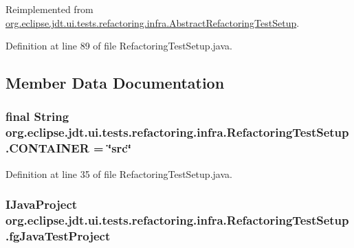 Reimplemented from \hyperlink{classorg_1_1eclipse_1_1jdt_1_1ui_1_1tests_1_1refactoring_1_1infra_1_1AbstractRefactoringTestSetup_a64befeff9fba889aac527480b952e971}{org.eclipse.jdt.ui.tests.refactoring.infra.AbstractRefactoringTestSetup}.



Definition at line 89 of file RefactoringTestSetup.java.



\subsection{Member Data Documentation}
\hypertarget{classorg_1_1eclipse_1_1jdt_1_1ui_1_1tests_1_1refactoring_1_1infra_1_1RefactoringTestSetup_ade13ca1a53557e54e9aa9108b671982a}{
\subsubsection[{CONTAINER}]{\setlength{\rightskip}{0pt plus 5cm}final String {\bf org.eclipse.jdt.ui.tests.refactoring.infra.RefactoringTestSetup.CONTAINER} = \char`\"{}src\char`\"{}}}
\label{classorg_1_1eclipse_1_1jdt_1_1ui_1_1tests_1_1refactoring_1_1infra_1_1RefactoringTestSetup_ade13ca1a53557e54e9aa9108b671982a}


Definition at line 35 of file RefactoringTestSetup.java.

\hypertarget{classorg_1_1eclipse_1_1jdt_1_1ui_1_1tests_1_1refactoring_1_1infra_1_1RefactoringTestSetup_ae1e850e75f49931a9f649b1c0e852d9f}{
\subsubsection[{fgJavaTestProject}]{\setlength{\rightskip}{0pt plus 5cm}IJavaProject {\bf org.eclipse.jdt.ui.tests.refactoring.infra.RefactoringTestSetup.fgJavaTestProject}}}
\label{classorg_1_1eclipse_1_1jdt_1_1ui_1_1tests_1_1refactoring_1_1infra_1_1RefactoringTestSetup_ae1e850e75f49931a9f649b1c0e852d9f}


